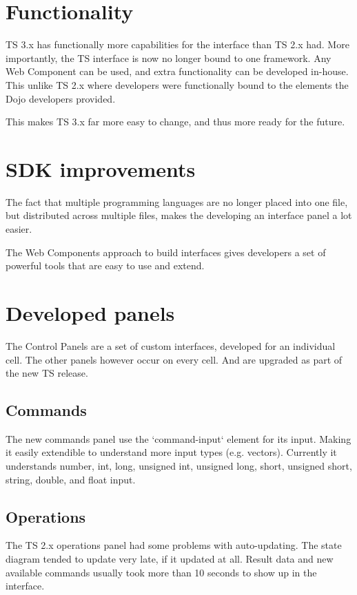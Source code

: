 \documentclass[journal]{IEEEtran}
\begin{document}
\section{Functionality}
TS 3.x has functionally more capabilities for the interface than TS 2.x had.
More importantly, the TS interface is now no longer bound to one framework.
Any Web Component can be used, and extra functionality can be developed in-house.
This unlike TS 2.x where developers were functionally bound to the elements the Dojo
developers provided.

This makes TS 3.x far more easy to change, and thus more ready for the future.

\section{SDK improvements}
The fact that multiple programming languages are no longer placed into one file,
but distributed across multiple files, makes the developing an interface panel
a lot easier.

The Web Components approach to build interfaces gives developers a set of
powerful tools that are easy to use and extend.


\section{Developed panels}
The Control Panels are a set of custom interfaces, developed for an individual cell.
The other panels however occur on every cell. And are upgraded as part of the
new TS release.
\subsection{Commands}
The new commands panel use the `command-input` element for its input. Making it
easily extendible to understand more input types (e.g. vectors).
Currently it understands number, int, long, unsigned int, unsigned long, short,
unsigned short, string, double, and float input.

\subsection{Operations}
The TS 2.x operations panel had some problems with auto-updating.
The state diagram tended to update very late, if it updated at all.
Result data and new available commands usually took more than 10 seconds to
show up in the interface.
\end{document}

